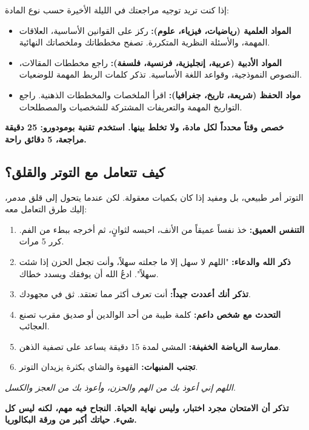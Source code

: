 \documentclass[12pt,a4paper]{book}
\newcommand{\quoteAr}[1]{%
	\begin{myquote}
		\itshape #1
	\end{myquote}
}
\newcommand{\importantAr}[1]{%
	\begin{important}
		\bfseries #1
	\end{important}
}
\begin{document}
إذا كنت تريد توجيه مراجعتك في الليلة الأخيرة حسب نوع المادة:

\begin{itemize}
	\item \textbf{المواد العلمية (رياضيات، فيزياء، علوم):} ركز على القوانين الأساسية، العلاقات المهمة، والأسئلة النظرية المتكررة. تصفح مخططاتك وملخصاتك النهائية.
	\item \textbf{المواد الأدبية (عربية، إنجليزية، فرنسية، فلسفة):} راجع مخططات المقالات، النصوص النموذجية، وقواعد اللغة الأساسية. تذكر كلمات الربط المهمة للوضعيات.
	\item \textbf{مواد الحفظ (شريعة، تاريخ، جغرافيا):} اقرأ الملخصات والمخططات الذهنية. راجع التواريخ المهمة والتعريفات المشتركة للشخصيات والمصطلحات.
\end{itemize}

\importantAr{خصص وقتاً محدداً لكل مادة، ولا تخلط بينها. استخدم تقنية بومودورو: 25 دقيقة مراجعة، 5 دقائق راحة.}

\subsection{كيف تتعامل مع التوتر والقلق؟}

التوتر أمر طبيعي، بل ومفيد إذا كان بكميات معقولة. لكن عندما يتحول إلى قلق مدمر، إليك طرق التعامل معه:

\begin{enumerate}
	\item \textbf{التنفس العميق:} خذ نفساً عميقاً من الأنف، احبسه لثوانٍ، ثم أخرجه ببطء من الفم. كرر 5 مرات.
	\item \textbf{ذكر الله والدعاء:} "اللهم لا سهل إلا ما جعلته سهلاً، وأنت تجعل الحزن إذا شئت سهلاً". ادعُ الله أن يوفقك ويسدد خطاك.
	\item \textbf{تذكر أنك أعددت جيداً:} أنت تعرف أكثر مما تعتقد. ثق في مجهودك.
	\item \textbf{التحدث مع شخص داعم:} كلمة طيبة من أحد الوالدين أو صديق مقرب تصنع العجائب.
	\item \textbf{ممارسة الرياضة الخفيفة:} المشي لمدة 15 دقيقة يساعد على تصفية الذهن.
	\item \textbf{تجنب المنبهات:} القهوة والشاي بكثرة يزيدان التوتر.
\end{enumerate}

\quoteAr{اللهم إني أعوذ بك من الهم والحزن، وأعوذ بك من العجز والكسل.}

\importantAr{تذكر أن الامتحان مجرد اختبار، وليس نهاية الحياة. النجاح فيه مهم، لكنه ليس كل شيء. حياتك أكبر من ورقة البكالوريا.}
\end{document}
